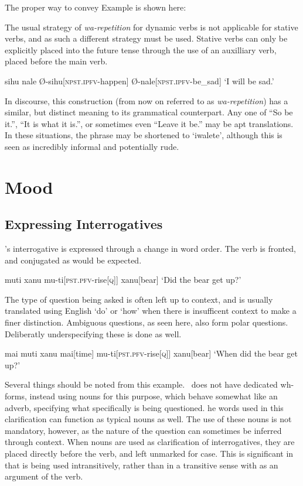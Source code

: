 The proper way to convey Example  is shown here:

The usual strategy of \textit{wa-repetition} for dynamic verbs is not applicable for stative verbs, and as such a different strategy must be used.
Stative verbs can only be explicitly placed into the future tense through the use of an auxilliary verb,  placed before the main verb.

\ex
\begingl
\glpreamble sihu nale
\endpreamble
Ø-sihu[\textsc{npst.ipfv-}happen]
Ø-nale[\textsc{npst.ipfv-}be\_sad]
\glft `I will be sad.'
\endgl
\xe

In discourse, this construction (from now on referred to as \textit{wa-repetition}) has a similar, but distinct meaning to its grammatical counterpart.
Any one of ``So be it.'', ``It is what it is.'', or sometimes even ``Leave it be.'' may be apt translations.
In these situations, the phrase may be shortened to `iwalete', although this is seen as incredibly informal and potentially rude.

\section{Mood}
\subsection{Expressing Interrogatives}

\langname 's interrogative is expressed through a change in word order.
The verb is fronted, and conjugated as would be expected.

\ex
\begingl
\glpreamble muti xanu
\endpreamble
mu-ti[\textsc{pst.pfv-}rise\textsc{[q]}]
xanu[bear]
\glft `Did the bear get up?'
\endgl
\xe

The type of question being asked is often left up to context, and is usually translated using English `do' or `how' when there is insufficent context to make a finer distinction.
Ambiguous questions, as seen here, also form polar questions.
Deliberatly underspecifying these is done as well.

\ex
\begingl
\glpreamble mai muti xanu
\endpreamble
mai[time]
mu-ti[\textsc{pst.pfv-}rise\textsc{[q]}]
xanu[bear]
\glft `When did the bear get up?'
\endgl
\xe

Several things should be noted from this example.
\langname\ does not have dedicated wh-forms, instead using nouns for this purpose, which behave somewhat like an adverb, specifying what specifically is being questioned.
he words used in this clarification can function as typical nouns as well.
The use of these nouns is not mandatory, however, as the nature of the question can sometimes be inferred through context.
When nouns are used as clarification of interrogatives, they are placed directly before the verb, and left unmarked for case.
This is significant in that  is being used intransitively, rather than in a transitive sense with  as an argument of the verb.

